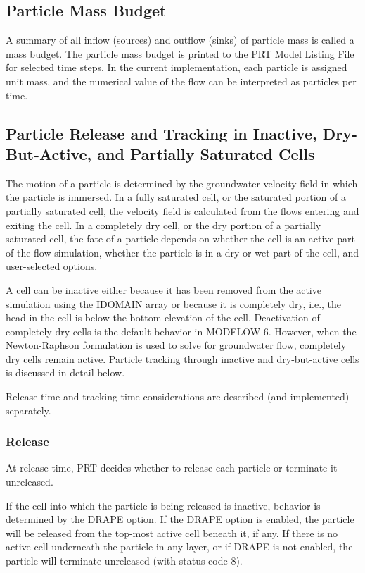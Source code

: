 \subsection{Particle Mass Budget}
A summary of all inflow (sources) and outflow (sinks) of particle mass is called a mass budget.  The particle mass budget is printed to the PRT Model Listing File for selected time steps.  In the current implementation, each particle is assigned unit mass, and the numerical value of the flow can be interpreted as particles per time.

\subsection{Particle Release and Tracking in Inactive, Dry-But-Active, and Partially Saturated Cells}

The motion of a particle is determined by the groundwater velocity field in which the particle is immersed. In a fully saturated cell, or the saturated portion of a partially saturated cell, the velocity field is calculated from the flows entering and exiting the cell. In a completely dry cell, or the dry portion of a partially saturated cell, the fate of a particle depends on whether the cell is an active part of the flow simulation, whether the particle is in a dry or wet part of the cell, and user-selected options.

A cell can be inactive either because it has been removed from the active simulation using the IDOMAIN array or because it is completely dry, i.e., the head in the cell is below the bottom elevation of the cell. Deactivation of completely dry cells is the default behavior in MODFLOW 6. However, when the Newton-Raphson formulation is used to solve for groundwater flow, completely dry cells remain active. Particle tracking through inactive and dry-but-active cells is discussed in detail below.

Release-time and tracking-time considerations are described (and implemented) separately.

\subsubsection{Release}

At release time, PRT decides whether to release each particle or terminate it unreleased.

If the cell into which the particle is being released is inactive, behavior is determined by the DRAPE option. If the DRAPE option is enabled, the particle will be released from the top-most active cell beneath it, if any. If there is no active cell underneath the particle in any layer, or if DRAPE is not enabled, the particle will terminate unreleased (with status code 8).

